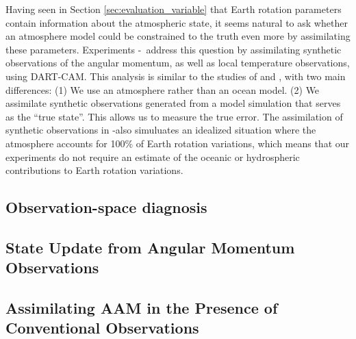 Having seen in Section \ref{sec:evaluation_variable} that Earth rotation parameters contain information about the atmospheric state, it seems natural to ask whether an atmosphere model could be constrained to the truth even more by assimilating these parameters. 
Experiments \NODA-\ERPRST ~address this question by assimilating synthetic observations of the angular momentum, as well as local temperature observations, using DART-CAM.
This analysis is similar to the studies of \citet{Saynisch2010,Saynisch2011} and \citet{Saynisch2012}, with two main differences:
(1) We use an atmosphere rather than an ocean model.
(2) We assimilate synthetic observations generated from a model simulation that serves as the ``true state''. This allows us to measure the true error.
The assimilation of synthetic observations in \ERPALL-\ERPRST also simuluates an idealized situation where the atmosphere accounts for 100\% of Earth rotation variations, which means that our experiments do not require an estimate of the oceanic or hydrospheric contributions to Earth rotation variations.

\subsection{Observation-space diagnosis}
\label{sec:obs_space}


\subsection{State Update from Angular Momentum Observations}
\label{sec:erpda}


\subsection{Assimilating AAM in the Presence of Conventional Observations}
\label{sec:added_value}



